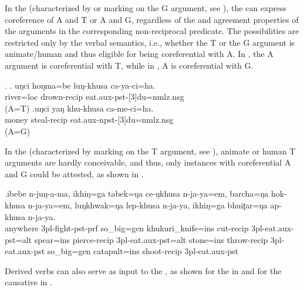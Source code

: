 In the  (characterized by  or  marking on the G argument, see ), the  can express coreference of A and T or A and G, regardless of the  and agreement properties of the arguments in the corresponding  non-reci\-pro\-cal predicate. The possibilities are restricted only by the verbal semantics, i.e., whether the T or the G argument is animate/human and thus eligible for being coreferential with A.  In \Next[a], the A argument  is coreferential with T, while in \Next[b], A is coreferential with G.

\ex. \ag.	uŋci hoŋma=be luŋ-khusa ca-ya-ci=ha.\\
		 river{\sc =loc} drown-{\sc recip}   eat{\sc .aux-pst-[3]du=nmlz.nsg}\\
	 (A=T)
 	\bg.uŋci yaŋ khu-khusa ca-me-ci=ha.\\
	 money steal{\sc -recip} eat{\sc .aux-npst-[3]du=nmlz.nsg}\\
	 (A=G)
	
	 
In the  (characterized by  marking on the T argument, see ), animate or human T arguments are hardly conceivable, and thus, only instances with coreferential A and G could be attested, as shown in \Next.
	
	
\exg.ibebe n-juŋ-a-ma,   ikhiŋ=ga tabek=ŋa ce-ŋkhusa  n-ja-ya=em,  barcha=ŋa  hok-khusa  n-ja-ya=em, luŋkhwak=ŋa lep-khusa n-ja-ya, ikhiŋ=ga bhuiʈar=ŋa ap-khusa n-ja-ya.\\
	anywhere {\sc 3pl-}fight{\sc -pst-prf} so\_big{\sc =gen}  khukuri\_knife{\sc =ins} cut{\sc -recip} {\sc 3pl-}eat{\sc .aux-pst=alt} spear{\sc =ins} pierce{\sc -recip} {\sc 3pl-}eat{\sc .aux-pst=alt} stone{\sc =ins} throw{\sc -recip} {\sc 3pl-}eat{\sc .aux-pst} so\_big{\sc =gen} catapult{\sc =ins} shoot{\sc -recip} {\sc 3pl-}eat{\sc .aux-pst}\\
	 
	

Derived verbs can also serve as input to the , as shown for the  in \Next[a] and for the causative in \Next[b].

